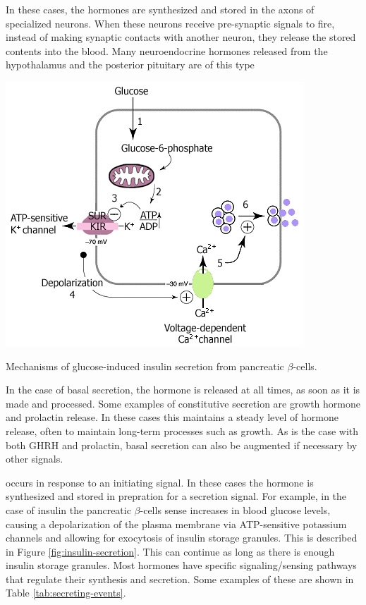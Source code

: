 \documentclass{tufte-handout}
\begin{document}
  In these cases, the hormones are synthesized and stored in the axons of specialized neurons.  When these neurons receive pre-synaptic signals to fire, instead of making synaptic contacts with another neuron, they release the stored contents into the blood.  Many neuroendocrine hormones released from the hypothalamus and the posterior pituitary are of this type

\begin{marginfigure}
  \includegraphics{figures/insulin-secretion}
  \caption{Mechanisms of glucose-induced insulin secretion from pancreatic $\beta$-cells.}
    \label{fig:insulin-secretion}
\end{marginfigure}

  In the case of basal secretion, the hormone is released at all times, as soon as it is made and processed.  Some examples of constitutive secretion are growth hormone and prolactin release.  In these cases this maintains a steady level of hormone release, often to maintain long-term processes such as growth.  As is the case with both GHRH and prolactin, basal secretion can also be augmented if necessary by other signals.

 occurs in response to an initiating signal.  In these cases the hormone is synthesized and stored in prepration for a secretion signal.  For example, in the case of insulin the pancreatic $\beta$-cells sense increases in blood glucose levels, causing a depolarization of the plasma membrane via ATP-sensitive potassium channels and allowing for exocytosis of insulin storage granules.  This is described in Figure \ref{fig:insulin-secretion}.  This can continue as long as there is enough insulin storage granules.  Most hormones have specific signaling/sensing pathways that regulate their synthesis and secretion.  Some examples of these are shown in Table \ref{tab:secreting-events}.
\end{document}
